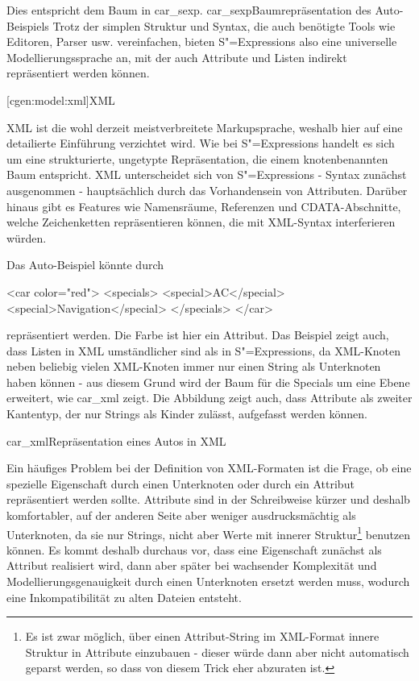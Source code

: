 \documentclass[a4paper, bibgerm]{book}
\newcommand\lsubsection{}
\newcommand\abb{}
\newcommand\fig{}
\newcommand{\sexps}{S"=Expressions}
\begin{document}
Dies entspricht dem Baum in \abb{car_sexp}.
\fig{car_sexp}{Baumrepräsentation des Auto-Beispiels} Trotz der simplen
Struktur und Syntax, die auch benötigte Tools wie Editoren, Parser
usw. vereinfachen, bieten \sexps{} also eine universelle
Modellierungssprache an, mit der auch Attribute und Listen indirekt
repräsentiert werden können.

\lsubsection[cgen:model:xml]{XML}

XML ist die wohl derzeit meistverbreitete Markupsprache, weshalb hier
auf eine detailierte Einführung verzichtet wird. Wie bei \sexps{}
handelt es sich um eine strukturierte, ungetypte Repräsentation, die
einem knotenbenannten Baum entspricht. XML unterscheidet sich von
\sexps{} - Syntax zunächst ausgenommen - hauptsächlich durch das
Vorhandensein von Attributen. Darüber hinaus gibt es Features wie
Namensräume, Referenzen und CDATA-Abschnitte, welche Zeichenketten
repräsentieren können, die mit XML-Syntax interferieren würden.

Das Auto-Beispiel könnte durch
\begin{code}
<car color="red">
  <specials>
    <special>AC</special>
    <special>Navigation</special>
  </specials>
</car>
\end{code} %
repräsentiert werden. Die Farbe ist hier ein Attribut. Das Beispiel
zeigt auch, dass Listen in XML umständlicher sind als in \sexps{}, da
XML-Knoten neben beliebig vielen XML-Knoten immer nur einen String als
Unterknoten haben können - aus diesem Grund wird der Baum für die
Specials um eine Ebene erweitert, wie \abb{car_xml} zeigt. Die Abbildung
zeigt auch, dass Attribute als zweiter Kantentyp, der nur Strings als
Kinder zulässt, aufgefasst werden können.

\fig{car_xml}{Repräsentation eines Autos in XML}

Ein häufiges Problem bei der Definition von XML-Formaten ist die
Frage, ob eine spezielle Eigenschaft durch einen Unterknoten oder
durch ein Attribut repräsentiert werden sollte. Attribute sind in der
Schreibweise kürzer und deshalb komfortabler, auf der anderen Seite
aber weniger ausdrucksmächtig als Unterknoten, da sie nur Strings,
nicht aber Werte mit innerer Struktur\footnote{Es ist zwar möglich,
  über einen Attribut-String im XML-Format innere Struktur in
  Attribute einzubauen - dieser würde dann aber nicht automatisch
  geparst werden, so dass von diesem Trick eher abzuraten ist.}
benutzen können. Es kommt deshalb durchaus vor, dass eine Eigenschaft
zunächst als Attribut realisiert wird, dann aber später bei wachsender
Komplexität und Modellierungsgenauigkeit durch einen Unterknoten
ersetzt werden muss, wodurch eine Inkompatibilität zu alten Dateien
entsteht.
\end{document}
